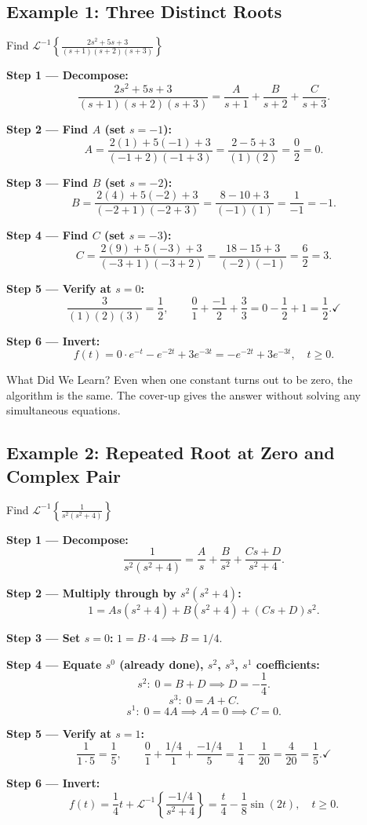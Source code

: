 \documentclass[12pt,a4paper]{article}
\begin{document}
\subsection{Example 1: Three Distinct Roots}
\begin{infobox}{Find $\mathcal{L}^{-1}\!\left\{\frac{2s^2+5s+3}{(s+1)(s+2)(s+3)}\right\}$}

\textbf{Step 1 --- Decompose:}
\[
  \frac{2s^2+5s+3}{(s+1)(s+2)(s+3)} = \frac{A}{s+1}+\frac{B}{s+2}+\frac{C}{s+3}.
\]

\textbf{Step 2 --- Find $A$ (set $s=-1$):}
\[
  A = \frac{2(1)+5(-1)+3}{(-1+2)(-1+3)} = \frac{2-5+3}{(1)(2)} = \frac{0}{2} = 0.
\]

\textbf{Step 3 --- Find $B$ (set $s=-2$):}
\[
  B = \frac{2(4)+5(-2)+3}{(-2+1)(-2+3)} = \frac{8-10+3}{(-1)(1)} = \frac{1}{-1} = -1.
\]

\textbf{Step 4 --- Find $C$ (set $s=-3$):}
\[
  C = \frac{2(9)+5(-3)+3}{(-3+1)(-3+2)} = \frac{18-15+3}{(-2)(-1)} = \frac{6}{2} = 3.
\]

\textbf{Step 5 --- Verify at $s=0$:}
\[
  \frac{3}{(1)(2)(3)}=\frac{1}{2},\qquad
  \frac{0}{1}+\frac{-1}{2}+\frac{3}{3} = 0-\frac{1}{2}+1=\frac{1}{2}.\checkmark
\]

\textbf{Step 6 --- Invert:}
\[
  f(t) = 0\cdot e^{-t} -e^{-2t}+3e^{-3t} = -e^{-2t}+3e^{-3t},\quad t\geq 0.
\]
\end{infobox}

\begin{learnbox}{What Did We Learn?}
Even when one constant turns out to be zero, the algorithm is the same.
The cover-up gives the answer without solving any simultaneous equations.
\end{learnbox}

\subsection{Example 2: Repeated Root at Zero and Complex Pair}
\begin{infobox}{Find $\mathcal{L}^{-1}\!\left\{\frac{1}{s^2(s^2+4)}\right\}$}

\textbf{Step 1 --- Decompose:}
\[
  \frac{1}{s^2(s^2+4)} = \frac{A}{s}+\frac{B}{s^2}+\frac{Cs+D}{s^2+4}.
\]

\textbf{Step 2 --- Multiply through by $s^2(s^2+4)$:}
\[
  1 = As(s^2+4) + B(s^2+4) + (Cs+D)s^2.
\]

\textbf{Step 3 --- Set $s=0$:} $1 = B\cdot 4 \implies B = 1/4$.

\textbf{Step 4 --- Equate $s^0$ (already done), $s^2$, $s^3$, $s^1$ coefficients:}
\[
  s^2:\; 0 = B+D \implies D=-\frac{1}{4}.
\]
\[
  s^3:\; 0 = A+C.
\]
\[
  s^1:\; 0 = 4A \implies A=0 \implies C=0.
\]

\textbf{Step 5 --- Verify at $s=1$:}
\[
  \frac{1}{1\cdot 5}=\frac{1}{5},\qquad \frac{0}{1}+\frac{1/4}{1}+\frac{-1/4}{5}=\frac{1}{4}-\frac{1}{20}=\frac{4}{20}=\frac{1}{5}.\checkmark
\]

\textbf{Step 6 --- Invert:}
\[
  f(t) = \frac{1}{4}t + \mathcal{L}^{-1}\!\left\{\frac{-1/4}{s^2+4}\right\}
  = \frac{t}{4} - \frac{1}{8}\sin(2t),\quad t\geq 0.
\]
\end{infobox}
\end{document}
